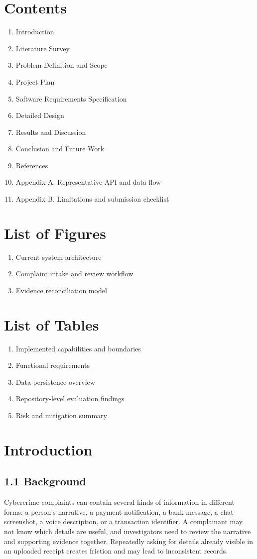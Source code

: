 \documentclass[12pt,a4paper,oneside]{report}
\begin{document}
\clearpage\chapter*{Contents}
\tableofcontents
\begin{enumerate}
\item Introduction
\item Literature Survey
\item Problem Definition and Scope
\item Project Plan
\item Software Requirements Specification
\item Detailed Design
\item Results and Discussion
\item Conclusion and Future Work
\item References
\item Appendix A. Representative API and data flow
\item Appendix B. Limitations and submission checklist
\end{enumerate}
\clearpage\chapter*{List of Figures}
\listoffigures
\begin{enumerate}
\item Current system architecture
\item Complaint intake and review workflow
\item Evidence reconciliation model
\end{enumerate}
\clearpage\chapter*{List of Tables}
\listoftables
\begin{enumerate}
\item Implemented capabilities and boundaries
\item Functional requirements
\item Data persistence overview
\item Repository-level evaluation findings
\item Risk and mitigation summary
\end{enumerate}
\clearpage\chapter{Introduction}
\section{1.1 Background}
Cybercrime complaints can contain several kinds of information in different forms: a person's narrative, a payment notification, a bank message, a chat screenshot, a voice description, or a transaction identifier. A complainant may not know which details are useful, and investigators need to review the narrative and supporting evidence together. Repeatedly asking for details already visible in an uploaded receipt creates friction and may lead to inconsistent records.
\end{document}
